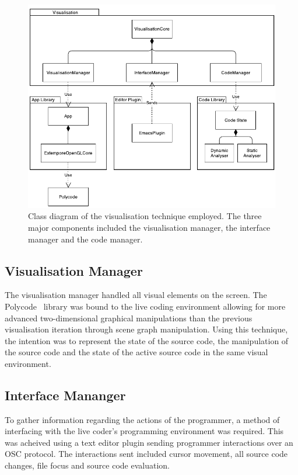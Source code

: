 \begin{figure}
  \centering \includegraphics[width=\columnwidth]{../images/diagrams/visualisation-class-diagram.pdf}
  \caption[Prototype (second iteration) class diagram]{Class diagram of the visualisation technique employed. The three major components included the visualisation manager, the interface manager and the code manager.}
\label{fig:visualisation-class-diagram}
\end{figure}

\subsection{Visualisation Manager}

The visualisation manager handled all visual elements on the screen. The Polycode~\cite{Safrin2013} library was bound to the live coding environment allowing for more advanced two-dimensional graphical manipulations than the previous visualisation iteration through scene graph manipulation. Using this technique, the intention was to represent the state of the source code, the manipulation of the source code and the state of the active source code in the same visual environment.

\subsection{Interface Mananger}
\label{sec:interface-manager}

To gather information regarding the actions of the programmer, a method of interfacing with the live coder's programming environment was required. This was acheived using a text editor plugin sending programmer interactions over an \ac{OSC} protocol. The interactions sent included cursor movement, all source code changes, file focus and source code evaluation.

